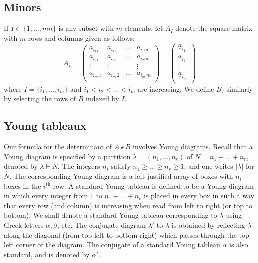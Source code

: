 \documentclass[10pt]{amsart}
\theoremstyle{definition}
\theoremstyle{remark}
\numberwithin{equation}{section}
\newcommand{\0}{\color{blue}{\mathsf{0}}}
\begin{document}
 \subsection{Minors}
 If $I \subset \{1,\ldots, mn\}$ is any subset with $m$ elements, let $A_I$ denote the square matrix with $m$ rows and columns given as follows:
 \[ A_I =  \begin{pmatrix}  a_{i_11} & a_{i_12} &  \ldots & a_{i_1m} \\ 
a_{i_21} & a_{i_22} &  \ldots & a_{i_2m} \\ 
 \vdots    &  \vdots &  & \vdots \\
a_{i_m\, 1 } & a_{i_m \, 2} &  \ldots & a_{i_m \, m} \\ 
 \end{pmatrix}  = 
 \begin{pmatrix}  \underline{a}_{i_1} \\ 
 \underline{a}_{i_2} \\ 
      \vdots \\
\underline{a}_{i_m} \\ 
 \end{pmatrix}    
 \]
where $I= \{i_1,\ldots, i_m\}$ and $i_1<i_2< \ldots< i_m$ are increasing.  We define $B_I$ similarly by selecting the rows of $B$ indexed by $I$. 


 
\subsection{Young tableaux}  Our formula for the determinant of $A\star B$ involves  Young diagrams. Recall that a Young diagram is specified by a partition 
$\lambda = (n_1,\ldots, n_r)$  of $N=n_1+ \ldots + n_r$, denoted by $\lambda \vdash N$.    The integers $n_i$ satisfy   $n_1\geq \ldots \geq n_r\geq 1$, and one writes $|\lambda|$ for $N$. The corresponding Young diagram is  a left-justified array of boxes with $n_i$ boxes in the $i^\mathrm{th}$ row. A standard Young tableau is defined to be a Young diagram in which every integer from $1$ to $n_1+\ldots +n_r$ is placed in every box in such a way that  every row (and column) is increasing when read from left to right (or top to bottom).  We shall denote a standard Young tableau corresponding to $\lambda$ using Greek letters $\alpha, \beta$, etc.
The conjugate diagram $\lambda'$ to $\lambda$ is obtained by reflecting $\lambda$ along the diagonal (from top-left to bottom-right) which passes through the  top-left corner of the diagram. The conjugate of a standard Young tableau $\alpha$ is also standard, and is denoted by $\alpha'$.
\end{document}
